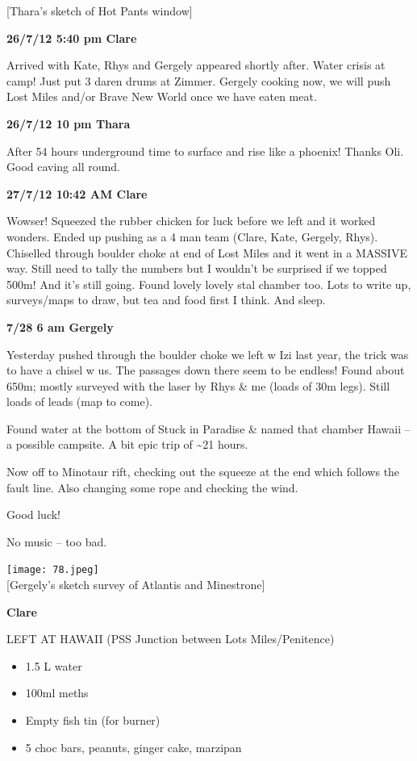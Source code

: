{[}Thara's sketch of Hot Pants window{]}

\textbf{26/7/12 5:40 pm Clare}

Arrived with Kate, Rhys and Gergely appeared shortly after. Water crisis
at camp! Just put 3 daren drums at Zimmer. Gergely cooking now, we will
push Lost Miles and/or Brave New World once we have eaten meat.

\textbf{26/7/12 10 pm Thara}

After 54 hours underground time to surface and rise like a phoenix!
Thanks Oli. Good caving all round.

\textbf{27/7/12 10:42 AM Clare}

Wowser! Squeezed the rubber chicken for luck before we left and it
worked wonders. Ended up pushing as a 4 man team (Clare, Kate, Gergely,
Rhys). Chiselled through boulder choke at end of Lost Miles and it went
in a MASSIVE way. Still need to tally the numbers but I wouldn't be
surprised if we topped 500m! And it's still going. Found lovely lovely
stal chamber too. Lots to write up, surveys/maps to draw, but tea and
food first I think. And sleep.

\textbf{7/28 6 am Gergely}

Yesterday pushed through the boulder choke we left w Izi last year, the
trick was to have a chisel w us. The passages down there seem to be
endless! Found about 650m; mostly surveyed with the laser by Rhys \& me
(loads of 30m legs). Still loads of leads (map to come).

Found water at the bottom of Stuck in Paradise \& named that chamber
Hawaii -- a possible campsite. A bit epic trip of \textasciitilde{}21
hours.

Now off to Minotaur rift, checking out the squeeze at the end which
follows the fault line. Also changing some rope and checking the wind.

Good luck!

No music -- too bad.

\texttt{[image: 78.jpeg]}\\
{[}Gergely's sketch survey of Atlantis and Minestrone{]}

\textbf{Clare}

LEFT AT HAWAII (PSS Junction between Lots Miles/Penitence)

\begin{itemize}
\tightlist
\item
  1.5 L water
\item
  100ml meths
\item
  Empty fish tin (for burner)
\item
  5 choc bars, peanuts, ginger cake, marzipan
\end{itemize}

